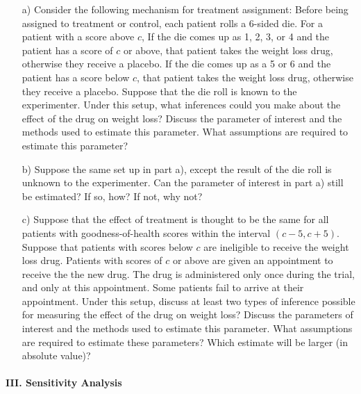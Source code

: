 \documentclass{article}
\begin{document}
      \begin{itemize}
        \item[a)]  Consider the following mechanism for treatment assignment:
          Before being assigned to treatment or control, each patient rolls a 6-sided die.
          For a patient with a score above $c$, 
          If the die comes up as 1, 2, 3, or 4 and the patient has a score of $c$ or above,
          that patient takes the weight loss drug, otherwise they receive a placebo.
          If the die comes up as a 5 or 6 and the patient has a score below $c$,
          that patient takes the weight loss drug, otherwise they receive a placebo.
          Suppose that the die roll is known to the experimenter.
          Under this setup,
          what inferences could you make about the effect of the drug on weight loss? 
          Discuss the parameter of interest and the methods used to estimate this parameter.
          What assumptions are required to estimate this parameter?
        \item[b)]
          Suppose the same set up in part a), except the result of the die roll is unknown to the
          experimenter.  
          Can the parameter of interest in part a) still be estimated?
          If so, how?  If not, why not?
        \item[c)]
          Suppose that the effect of treatment is thought to be the same
          for all patients with goodness-of-health scores within the interval
          $(c-5,c+5)$.
          Suppose that patients with scores below $c$ 
          are ineligible to receive the weight loss drug.
          Patients with scores of $c$ or above are given an appointment to receive 
          the the new drug.
          The drug is administered only once during the trial, and only at this appointment.
          Some patients fail to arrive at their appointment.
          Under this setup,
          discuss at least two types of inference 
          possible for measuring the effect of the drug on weight loss? 
          Discuss the parameters of interest and the methods used to estimate this parameter.
          What assumptions are required to estimate these parameters?
          Which estimate will be larger (in absolute value)?          
      \end{itemize}

\paragraph{\Large III. Sensitivity Analysis \\ \\}
\end{document}
